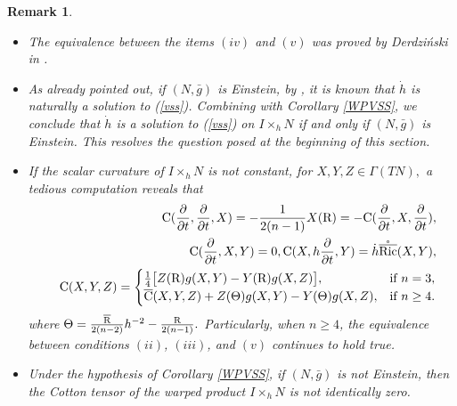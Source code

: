 \documentclass[10pt,leqno,oneside]{amsart}
\newtheorem{Rmk}{Remark}
\begin{document}
{    \begin{Rmk}\label{NEin}
          \begin{itemize}[leftmargin=0.3cm, itemindent=0.4cm]
            \item[{\rm(1)}.] The equivalence between the items $(iv)$ and $(v)$ was proved by Derdzi\'nski in {\rm\cite[Lemma 4]{Derdzinski1980}}.
            \item[{\rm(2)}.] As already pointed out, if $(N , \bar{g})$ is Einstein, by {\rm\cite[Lemma C3]{Lafontaine1983}}, it is known that $\dot{h}$ is naturally a solution to {\rm(\ref{vss})}. Combining with Corollary {\rm\ref{WPVSS}}, we conclude that $\dot{h}$ is a solution to {\rm(\ref{vss})} on $I\times_hN $ if and only if $(N, \bar{g})$ is Einstein. This resolves the question posed at the beginning of this section.
            \item[{\rm(3)}.] If the scalar curvature of $I\times_hN$ is not constant, for $X,Y,Z\in \Gamma(TN ),$ a tedious computation reveals that
                             \begin{eqnarray*}
                             &&{\rm C}(\frac{\partial}{\partial t},\frac{\partial}{\partial t},X)=-\frac{1}{2(n-1)}X({\rm R})=-{\rm C}(\frac{\partial}{\partial t},X ,\frac{\partial}{\partial t}),\\
                             &&{\rm C}(\frac{\partial}{\partial t},X,Y)=0,{\rm C}(X,h\frac{\partial}{\partial t},Y)=\dot{h}\mathring{\overline{{\rm{Ric}}}}(X,Y),\\
                             &&{\rm{C}}(X,Y,Z)=\begin{cases}
                                             \frac{1}{4}\big[Z({\rm R})g(X,Y)-Y({\rm R})g(X,Z)\big], & \text{if } n=3, \\
                                             \overline{{\rm{C}}}(X,Y,Z)+Z(\Theta)g(X,Y)-Y(\Theta)g(X,Z), & \text{if } n\geq4.
                                             \end{cases}
                             \end{eqnarray*}
                             where $\Theta=\frac{\overline{{\rm R}}}{2(n-2)}h^{-2}-\frac{{\rm R}}{2(n-1)}.$ Particularly, when \(n\geq 4\), the equivalence between conditions \((ii)\), \((iii)\), and \((v)\) continues to hold true.
            \item[{\rm(4)}.] Under the hypothesis of Corollary {\rm\ref{WPVSS}}, if $(N,\bar{g})$ is not Einstein, then the Cotton tensor of the warped product $I\times_hN$ is not identically zero.
          \end{itemize}
    \end{Rmk}


}
\end{document}
